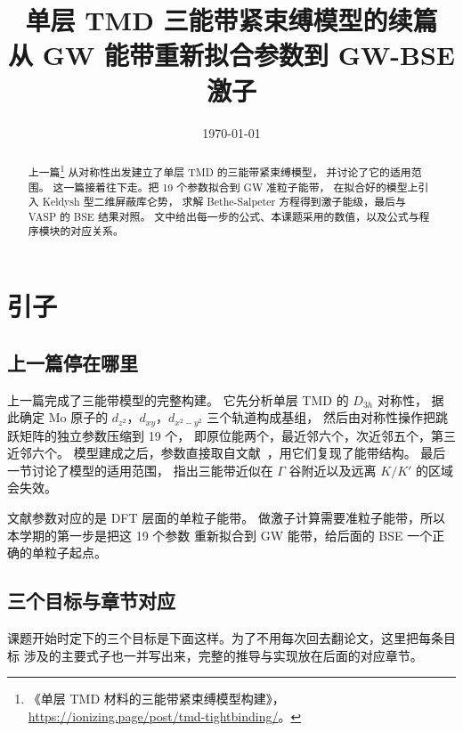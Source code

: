 \documentclass[11pt,a4paper]{ctexart}
\title{单层 TMD 三能带紧束缚模型的续篇\\[2mm]
\large 从 GW 能带重新拟合参数到 GW-BSE 激子}
\author{}
\date{\today}
\begin{document}
\maketitle

\begin{abstract}
上一篇\footnote{《单层 TMD 材料的三能带紧束缚模型构建》，\url{https://ionizing.page/post/tmd-tightbinding/}。}
从对称性出发建立了单层 TMD 的三能带紧束缚模型，
并讨论了它的适用范围。
这一篇接着往下走。把 19 个参数拟合到 GW 准粒子能带，
在拟合好的模型上引入 Keldysh 型二维屏蔽库仑势，
求解 Bethe-Salpeter 方程得到激子能级，最后与 VASP 的 BSE 结果对照。
文中给出每一步的公式、本课题采用的数值，以及公式与程序模块的对应关系。
\end{abstract}

\tableofcontents
\newpage

\newpage
\section{引子}

\subsection{上一篇停在哪里}

上一篇完成了三能带模型的完整构建。
它先分析单层 TMD 的 $D_{3h}$ 对称性，
据此确定 Mo 原子的 $d_{z^2}$，$d_{xy}$，$d_{x^2-y^2}$ 三个轨道构成基组，
然后由对称性操作把跳跃矩阵的独立参数压缩到 19 个，
即原位能两个，最近邻六个，次近邻五个，第三近邻六个。
模型建成之后，参数直接取自文献~\cite{liu2013}，用它们复现了能带结构。
最后一节讨论了模型的适用范围，
指出三能带近似在 $\Gamma$ 谷附近以及远离 $K/K'$ 的区域会失效。

文献参数对应的是 DFT 层面的单粒子能带。
做激子计算需要准粒子能带，所以本学期的第一步是把这 19 个参数
重新拟合到 GW 能带，给后面的 BSE 一个正确的单粒子起点。

\subsection{三个目标与章节对应}

课题开始时定下的三个目标是下面这样。为了不用每次回去翻论文，这里把每条目标
涉及的主要式子也一并写出来，完整的推导与实现放在后面的对应章节。
\end{document}
